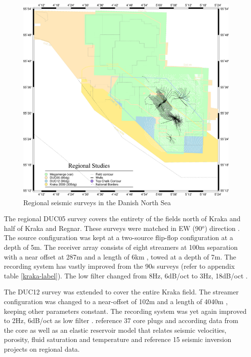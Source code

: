 \begin{figure}[!hbt]
\centering
\includegraphics[width=\textwidth]{figures/data/regional.png}
\caption{Regional seismic surveys in the Danish North Sea}
\end{figure}

The regional DUC05 survey covers the entirety of the fields north of Kraka and half of Kraka and Regnar. These surveys were matched in EW (90$^o$) direction \citep{Calvert2014}. The source configuration was kept at a two-source flip-flop configuration at a depth of 5m. The receiver array consists of eight streamers at 100m separation with a near offset at 287m and a length of 6km \citep{Svay2013}, towed at a depth of 7m. The recording system has vastly improved from the 90s surveys (refer to appendix table \ref{kraka-label}). The low filter changed from 8Hz, 6dB/oct to 3Hz, 18dB/oct \citep{Calvert2014}.

The DUC12 survey was extended to cover the entire Kraka field. The streamer configuration was changed to a near-offset of 102m and a length of 4040m \citep{Svay2013}, keeping other parameters constant. The recording system was yet again improved to 2Hz, 6dB/oct as low filter \citep{Calvert2014}. \citet{Dorn-Lopez2005} reference 37 core plugs and according data from the core as well as an elastic reservoir model that relates seismic velocities, porosity, fluid saturation and temperature and \citet{Micksch2014} reference 15 seismic inversion projects on regional data.

